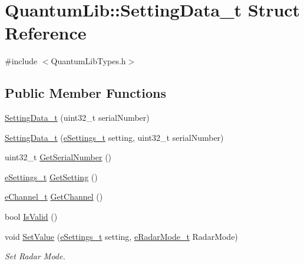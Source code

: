 \hypertarget{struct_quantum_lib_1_1_setting_data__t}{}\section{Quantum\+Lib\+:\+:Setting\+Data\+\_\+t Struct Reference}
\label{struct_quantum_lib_1_1_setting_data__t}


{\ttfamily \#include $<$Quantum\+Lib\+Types.\+h$>$}

\subsection*{Public Member Functions}
\begin{DoxyCompactItemize}
\item 
\mbox{\hyperlink{struct_quantum_lib_1_1_setting_data__t_aea4f34641cefd607673f71a52ac5738d}{Setting\+Data\+\_\+t}} (uint32\+\_\+t serial\+Number)
\item 
\mbox{\hyperlink{struct_quantum_lib_1_1_setting_data__t_a33c4a2b2ab18ff5a1585b16671051be7}{Setting\+Data\+\_\+t}} (\mbox{\hyperlink{namespace_quantum_lib_acc8124e3e65bca4aa798d03a55e3d54c}{e\+Settings\+\_\+t}} setting, uint32\+\_\+t serial\+Number)
\item 
uint32\+\_\+t \mbox{\hyperlink{struct_quantum_lib_1_1_setting_data__t_a884208dbd84bede1bb678526f18c98b7}{Get\+Serial\+Number}} ()
\item 
\mbox{\hyperlink{namespace_quantum_lib_acc8124e3e65bca4aa798d03a55e3d54c}{e\+Settings\+\_\+t}} \mbox{\hyperlink{struct_quantum_lib_1_1_setting_data__t_a35a86a3ade9011cba431902b12ead85a}{Get\+Setting}} ()
\item 
\mbox{\hyperlink{namespace_quantum_lib_ad62fc36ad3cd7ee810cbfc545d04ea9c}{e\+Channel\+\_\+t}} \mbox{\hyperlink{struct_quantum_lib_1_1_setting_data__t_a355a145df04da301a7902d5a89d99f44}{Get\+Channel}} ()
\item 
bool \mbox{\hyperlink{struct_quantum_lib_1_1_setting_data__t_a599520a391998e02c93c86211d5b9401}{Is\+Valid}} ()
\item 
void \mbox{\hyperlink{struct_quantum_lib_1_1_setting_data__t_afbf4f07b95c1ef9d35bfdf8a362bd2e2}{Set\+Value}} (\mbox{\hyperlink{namespace_quantum_lib_acc8124e3e65bca4aa798d03a55e3d54c}{e\+Settings\+\_\+t}} setting, \mbox{\hyperlink{namespace_quantum_lib_ade0390db62ad71cd1a56b97245d00619}{e\+Radar\+Mode\+\_\+t}} Radar\+Mode)
\begin{DoxyCompactList}\small\item\em Set Radar Mode. \end{DoxyCompactList}\item 

\end{DoxyCompactItemize}

